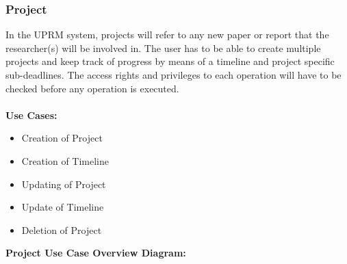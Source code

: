 \subsubsection{Project}
	In the UPRM system, projects will refer to any new paper or report that the researcher(s) will be involved in. The user has to be able to create multiple projects and keep track of progress by means of a timeline and project specific sub-deadlines.
	The access rights and privileges to each operation will have to be checked before any operation is executed.\\ \\
	\textbf{Use Cases:}
	\begin{itemize}
		\item Creation of Project
		\item Creation of Timeline
		\item Updating of Project
		\item Update of Timeline
		\item Deletion of Project \\
	\end{itemize}
	\textbf{Project Use Case Overview Diagram:}\\
	\centerline{}		
	